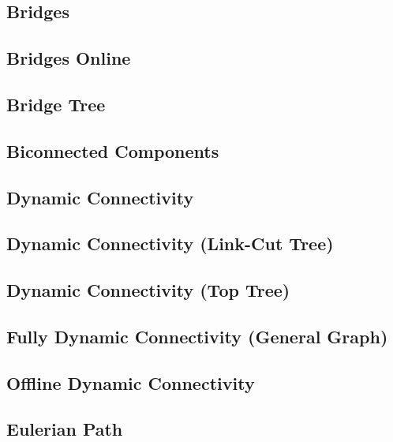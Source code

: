 \documentclass[10pt,letterpaper,landscape,twocolumn]{article}
\begin{document}
\subsection{Bridges}

\subsection{Bridges Online}

\subsection{Bridge Tree}

\subsection{Biconnected Components}

\subsection{Dynamic Connectivity}

\subsection{Dynamic Connectivity (Link-Cut Tree)}

\subsection{Dynamic Connectivity (Top Tree)}

\subsection{Fully Dynamic Connectivity (General Graph)}

\subsection{Offline Dynamic Connectivity}

\subsection{Eulerian Path}

\end{document}
